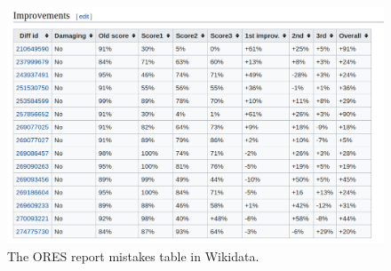 \begin{figure}[h]
  \centering
  \includegraphics[width=.80\textwidth]{figures/ORES_report_mistakes_table}
  \caption{The ORES report mistakes table in Wikidata.}
  \label{fig:ores_report_mistakes}
\end{figure}
